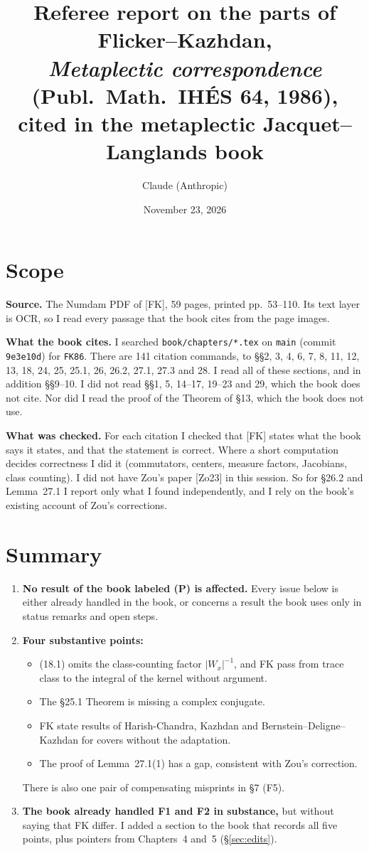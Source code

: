 \documentclass[12pt,letterpaper]{article}
\title{Referee report on the parts of Flicker--Kazhdan,\\ \emph{Metaplectic correspondence} (Publ.\ Math.\ IH\'ES 64, 1986),\\ cited in the metaplectic Jacquet--Langlands book}
\author{Claude (Anthropic)}
\date{November 23, 2026}
\begin{document}
\maketitle

\section{Scope}

\textbf{Source.} The Numdam PDF of [FK], 59 pages, printed pp.~53--110. Its text layer is OCR, so I read every passage that the book cites from the page images.

\textbf{What the book cites.} I searched \texttt{book/chapters/*.tex} on \texttt{main} (commit \texttt{9e3e10d}) for \texttt{FK86}. There are 141 citation commands, to \S\S2, 3, 4, 6, 7, 8, 11, 12, 13, 18, 24, 25, 25.1, 26, 26.2, 27.1, 27.3 and 28. I read all of these sections, and in addition \S\S9--10. I did not read \S\S1, 5, 14--17, 19--23 and 29, which the book does not cite. Nor did I read the proof of the Theorem of \S13, which the book does not use.

\textbf{What was checked.} For each citation I checked that [FK] states what the book says it states, and that the statement is correct. Where a short computation decides correctness I did it (commutators, centers, measure factors, Jacobians, class counting). I did not have Zou's paper [Zo23] in this session. So for \S26.2 and Lemma~27.1 I report only what I found independently, and I rely on the book's existing account of Zou's corrections.

\section{Summary}

\begin{enumerate}[label=(\arabic*)]
\item \textbf{No result of the book labeled (P) is affected.} Every issue below is either already handled in the book, or concerns a result the book uses only in status remarks and open steps.
\item \textbf{Four substantive points:}
 \begin{itemize}
 \item[F1.] (18.1) omits the class-counting factor $|W_x|^{-1}$, and FK pass from trace class to the integral of the kernel without argument.
 \item[F2.] The \S25.1 Theorem is missing a complex conjugate.
 \item[F3.] FK state results of Harish-Chandra, Kazhdan and Bernstein--Deligne--Kazhdan for covers without the adaptation.
 \item[F4.] The proof of Lemma~27.1(1) has a gap, consistent with Zou's correction.
 \end{itemize}
 There is also one pair of compensating misprints in \S7 (F5).
\item \textbf{The book already handled F1 and F2 in substance,} but without saying that FK differ. I added a section to the book that records all five points, plus pointers from Chapters~4 and~5 (\S\ref{sec:edits}).
\end{enumerate}
\end{document}
